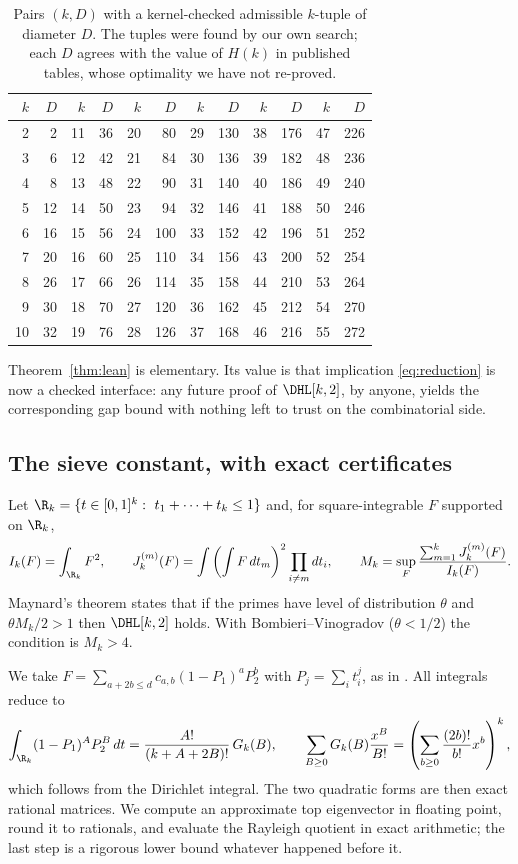 \begin{table}[h]
\caption{Pairs $(k,D)$ with a kernel-checked admissible $k$-tuple of diameter
$D$. The tuples were found by our own search; each $D$ agrees with the value
of $H(k)$ in published tables, whose optimality we have not re-proved.}
\label{tab:tuples}
\begin{tabular}{@{}rr@{\qquad}rr@{\qquad}rr@{\qquad}rr@{\qquad}rr@{\qquad}rr@{}}
\toprule
$k$&$D$&$k$&$D$&$k$&$D$&$k$&$D$&$k$&$D$&$k$&$D$\\
\midrule
2&2&11&36&20&80&29&130&38&176&47&226\\
3&6&12&42&21&84&30&136&39&182&48&236\\
4&8&13&48&22&90&31&140&40&186&49&240\\
5&12&14&50&23&94&32&146&41&188&50&246\\
6&16&15&56&24&100&33&152&42&196&51&252\\
7&20&16&60&25&110&34&156&43&200&52&254\\
8&26&17&66&26&114&35&158&44&210&53&264\\
9&30&18&70&27&120&36&162&45&212&54&270\\
10&32&19&76&28&126&37&168&46&216&55&272\\
\bottomrule
\end{tabular}
\end{table}

Theorem~\ref{thm:lean} is elementary. Its value is that implication
\eqref{eq:reduction} is now a checked interface: any future proof of
$\DHL[k,2]$, by anyone, yields the corresponding gap bound with nothing left
to trust on the combinatorial side.

\subsection{The sieve constant, with exact certificates}

Let $\R_k=\{t\in[0,1]^k:\ t_1+\dots+t_k\le1\}$ and, for square-integrable $F$
supported on $\R_k$,
\[
I_k(F)=\int_{\R_k}F^2,\qquad
J_k^{(m)}(F)=\int\left(\int F\,dt_m\right)^{2}\prod_{i\ne m}dt_i,\qquad
M_k=\sup_F\frac{\sum_{m=1}^{k}J_k^{(m)}(F)}{I_k(F)}.
\]
Maynard's theorem \cite[Prop.~4.2]{May15} states that if the primes have level
of distribution $\theta$ and $\theta M_k/2>1$ then $\DHL[k,2]$ holds. With
Bombieri--Vinogradov ($\theta<1/2$) the condition is $M_k>4$.

We take $F=\sum_{a+2b\le d}c_{a,b}(1-P_1)^aP_2^b$ with $P_j=\sum_it_i^j$, as
in \cite[\S8]{May15}. All integrals reduce to
\[
\int_{\R_k}(1-P_1)^AP_2^B\,dt=\frac{A!}{(k+A+2B)!}\,G_k(B),\qquad
\sum_{B\ge0}G_k(B)\frac{x^B}{B!}=\left(\sum_{b\ge0}\frac{(2b)!}{b!}x^b\right)^{k},
\]
which follows from the Dirichlet integral. The two quadratic forms are then
exact rational matrices. We compute an approximate top eigenvector in
floating point, round it to rationals, and evaluate the Rayleigh quotient in
exact arithmetic; the last step is a rigorous lower bound whatever happened
before it.

